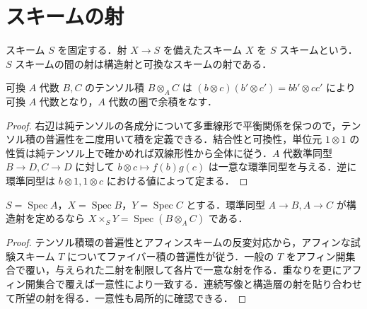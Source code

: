 \section{スキームの射}
\begin{defn}[基礎スキームと構造射]
スキーム $S$ を固定する．射 $X\to S$ を備えたスキーム $X$ を $S$ スキームという．$S$ スキームの間の射は構造射と可換なスキームの射である．
\end{defn}
\begin{prop}[テンソル積環の普遍性]
可換 $A$ 代数 $B,C$ のテンソル積 $B\otimes_A C$ は $(b\otimes c)(b'\otimes c')=bb'\otimes cc'$ により可換 $A$ 代数となり，$A$ 代数の圏で余積をなす．
\end{prop}
\begin{proof}
右辺は純テンソルの各成分について多重線形で平衡関係を保つので，テンソル積の普遍性を二度用いて積を定義できる．結合性と可換性，単位元 $1\otimes1$ の性質は純テンソル上で確かめれば双線形性から全体に従う．$A$ 代数準同型 $B\to D,C\to D$ に対して $b\otimes c\mapsto f(b)g(c)$ は一意な環準同型を与える．逆に環準同型は $b\otimes1,1\otimes c$ における値によって定まる．
\end{proof}
\begin{prop}[アフィンスキームのファイバー積]
$S=\operatorname{Spec}A$，$X=\operatorname{Spec}B$，$Y=\operatorname{Spec}C$ とする．環準同型 $A\to B,A\to C$ が構造射を定めるなら $X\times_S Y=\operatorname{Spec}(B\otimes_A C)$ である．
\end{prop}
\begin{proof}
テンソル積環の普遍性とアフィンスキームの反変対応から，アフィンな試験スキーム $T$ についてファイバー積の普遍性が従う．一般の $T$ をアフィン開集合で覆い，与えられた二射を制限して各片で一意な射を作る．重なりを更にアフィン開集合で覆えば一意性により一致する．連続写像と構造層の射を貼り合わせて所望の射を得る．一意性も局所的に確認できる．
\end{proof}
